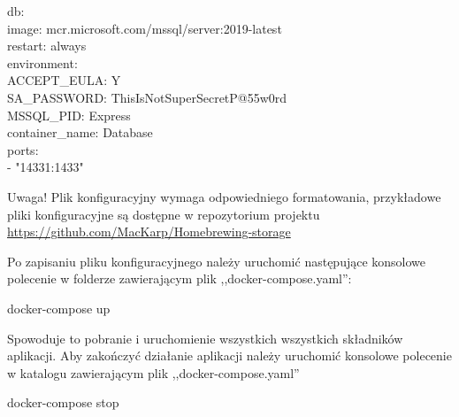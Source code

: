 \documentclass[12pt,a4paper]{article}
\begin{document}
\begin{tcolorbox}[minipage,colback=white,arc=0pt,outer arc=0pt, fontupper=\footnotesize]
\begin{tabbing}
    					\> db: \\
						\>\> image: mcr.microsoft.com/mssql/server:2019-latest \\
        				\>\> restart: always \\
        				\>\> environment: \\
            			\>\>\> ACCEPT\_EULA: Y \\
            			\>\>\> SA\_PASSWORD: ThisIsNotSuperSecretP@55w0rd \\
            			\>\>\> MSSQL\_PID: Express \\
        				\>\> container\_name: Database \\
        				\>\> ports: \\
						\>\>\> - "14331:1433"
					\end{tabbing}
				\end{tcolorbox}	
				\begin{tcolorbox}[minipage,colback=white,arc=0pt,outer arc=0pt, fontupper=\scriptsize]
					Uwaga! Plik konfiguracyjny wymaga odpowiedniego formatowania, przykładowe pliki konfiguracyjne są dostępne w repozytorium projektu
					\url{https://github.com/MacKarp/Homebrewing-storage}
				\end{tcolorbox}
				Po zapisaniu pliku konfiguracyjnego należy uruchomić następujące konsolowe polecenie w folderze zawierającym plik ,,docker-compose.yaml'':
				\begin{tcolorbox}[minipage,colback=white,arc=0pt,outer arc=0pt, fontupper=\scriptsize]
					docker-compose up
				\end{tcolorbox}
				Spowoduje to pobranie i uruchomienie wszystkich wszystkich składników aplikacji. Aby zakończyć działanie aplikacji należy uruchomić konsolowe
				polecenie w katalogu zawierającym plik ,,docker-compose.yaml''  	
				\begin{tcolorbox}[minipage,colback=white,arc=0pt,outer arc=0pt, fontupper=\scriptsize]
					docker-compose stop			
				\end{tcolorbox}

	\newpage
	
\end{document}
